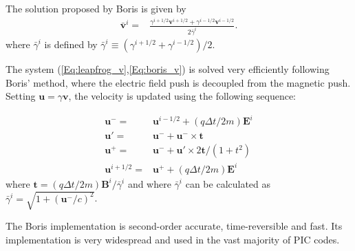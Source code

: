 

The solution proposed by Boris \cite{BorisICNSP70} is given by 
\begin{align}
\mathbf{\bar{v}}^{i}= & \frac{\gamma^{i+1/2}\mathbf{v}^{i+1/2}+\gamma^{i-1/2}\mathbf{v}^{i-1/2}}{2\bar{\gamma}^{i}}.\label{Eq:boris_v}
\end{align}
where $\bar{\gamma}^{i}$ is defined by $\bar{\gamma}^{i} \equiv (\gamma^{i+1/2}+\gamma^{i-1/2} )/2$.

The system (\ref{Eq:leapfrog_v},\ref{Eq:boris_v}) is solved very
efficiently following Boris' method, where the electric field push
is decoupled from the magnetic push. Setting $\mathbf{u}=\gamma\mathbf{v}$, the
velocity is updated using the following sequence:

\begin{subequations}
\begin{align}
\mathbf{u^{-}}= & \mathbf{u}^{i-1/2}+\left(q\Delta t/2m\right)\mathbf{E}^{i}\\
\mathbf{u'}= & \mathbf{u}^{-}+\mathbf{u}^{-}\times\mathbf{t}\\
\mathbf{u}^{+}= & \mathbf{u}^{-}+\mathbf{u'}\times2\mathbf{t}/(1+t^{2})\\
\mathbf{u}^{i+1/2}= & \mathbf{u}^{+}+\left(q\Delta t/2m\right)\mathbf{E}^{i}
\end{align}
\end{subequations}
where $\mathbf{t}=\left(q\Delta t/2m\right)\mathbf{B}^{i}/\bar{\gamma}^{i}$ and where
$\bar{\gamma}^{i}$ can be calculated as $\bar{\gamma}^{i}=\sqrt{1+(\mathbf{u}^-/c)^2}$. 

The Boris implementation is second-order accurate, time-reversible and fast. Its implementation is very widespread and used in the vast majority of PIC codes.
